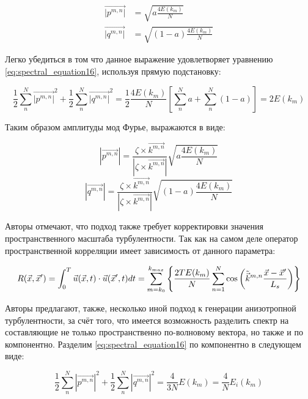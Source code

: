 \begin{align}
    \label{eq:spectral_equation16_2}
    \vec{|p^{m,n}|} & = \sqrt{a \frac{4 E(k_m)}{N}} \nonumber \\
    \vec{|q^{m,n}|} & = \sqrt{(1 - a) \frac{4 E(k_m)}{N}}
\end{align}

Легко убедиться в том что данное выражение удовлетворяет уравнению \eqref{eq:spectral_equation16}, используя прямую подстановку:

\begin{equation}
    \frac{1}{2} \sum_{n}^N \vec{|p^{m,n}|}^2 + \frac{1}{2} \sum_{n}^N \vec{|q^{m,n}|}^2 = \frac{1}{2} \frac{4 E(k_m)}{N} \left[ 
    \sum_n^N a + \sum_n^N (1 - a) \right] = 2 E(k_m)
\end{equation}

Таким образом амплитуды мод Фурье, выражаются в виде:

\begin{equation}
    \label{eq:spectral_equation17_1}
    |\vec{p^{m,n}}| = \frac{\zeta \times \vec{k^{m,n}}}{|\zeta \times \vec{k^{m,n}}|} \sqrt{a \frac{4 E(k_m)}{N}}
\end{equation}
\begin{equation}
    \label{eq:spectral_equation17_2}
    |\vec{q^{m,n}}| = \frac{\zeta \times \vec{k^{m,n}}}{|\zeta \times \vec{k^{m,n}}|} \sqrt{(1 - a) \frac{4 E(k_m)}{N}}
\end{equation}

Авторы отмечают, что подход также требует корректировки значения пространственного масштаба турбулентности. Так как на самом деле оператор пространственной корреляции имеет зависимость от данного параметра:

\begin{equation}
    \label{eq:spectral_equation17}
    R(\vec x, \vec x') = \int_0^T \vec{u}(\vec x, t) \cdot \vec{u}(\vec x', t) dt \\
    = \sum_{m=k_0}^{k_{max}} \left\{ \frac{2 T E(k_m)}{N} \sum_{n=1}^N \cos{\left( \Tilde{\vec k}^{m,n} 
    \frac{\vec x - \vec x'}{L_s} \right)} \right\}
\end{equation}

Авторы предлагают, также, несколько иной подход к генерации анизотропной турбулентности, за счёт того, что имеется возможность разделить спектр на составляющие не только пространственно по-волновому вектора, но также и по компонентно. Разделим \eqref{eq:spectral_equation16} по компонентно в следующем виде:

\begin{equation}
    \label{eq:spectral_equation18}
    \frac{1}{2} \sum_{n}^N |\vec{p^{m,n}}|^2 + \frac{1}{2} \sum_{n}^N |\vec{q^{m,n}}|^2 = \frac{4}{3 N} E(k_m) = \frac{4}{N} E_i(k_m) 
\end{equation}

